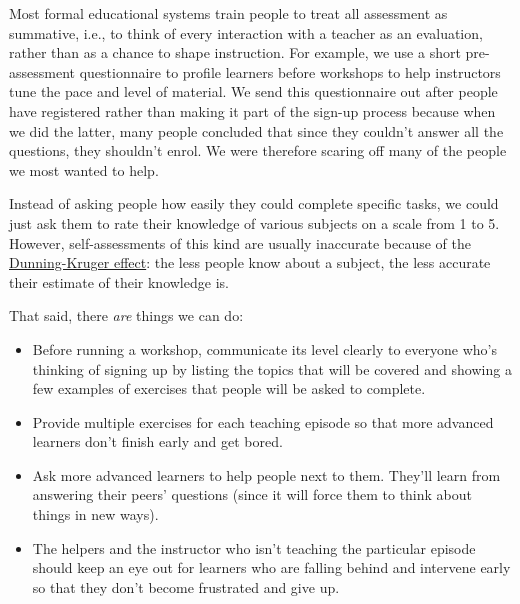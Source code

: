 
Most formal educational systems train people to treat all assessment
as summative, i.e., to think of every interaction with a teacher as an
evaluation, rather than as a chance to shape instruction.  For
example, we use a short pre-assessment questionnaire to profile
learners before workshops to help instructors tune the pace and level
of material. We send this questionnaire out after people have
registered rather than making it part of the sign-up process because
when we did the latter, many people concluded that since they couldn't
answer all the questions, they shouldn't enrol. We were therefore
scaring off many of the people we most wanted to help.

Instead of asking people how easily they could complete specific tasks,
we could just ask them to rate their knowledge of various subjects on a
scale from 1 to 5. However, self-assessments of this kind are usually
inaccurate because of the
\href{https://en.wikipedia.org/wiki/Dunning\%E2\%80\%93Kruger\_effect}{Dunning-Kruger
effect}: the less people know about a subject, the less accurate their
estimate of their knowledge is.

That said, there \emph{are} things we can do:

\begin{itemize}

\item
  Before running a workshop, communicate its level clearly to everyone
  who's thinking of signing up by listing the topics that will be
  covered and showing a few examples of exercises that people will be
  asked to complete.

\item
  Provide multiple exercises for each teaching episode so that more
  advanced learners don't finish early and get bored.

\item
  Ask more advanced learners to help people next to them. They'll
  learn from answering their peers' questions (since it will force
  them to think about things in new ways).

\item
  The helpers and the instructor who isn't teaching the particular
  episode should keep an eye out for learners who are falling behind
  and intervene early so that they don't become frustrated and give
  up.

\end{itemize}

